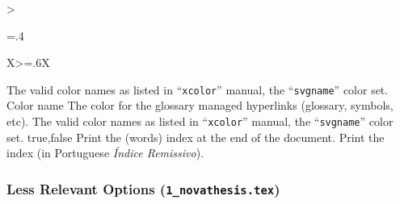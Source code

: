 \begin{xltabular}{\linewidth}{>{\hsize=.4\hsize\raggedright\arraybackslash}X>{\hsize=.6\hsize}X}
	{%
		The valid color names as listed in “\texttt{xcolor}” manual, the “\texttt{svgname}” color set.
    }
    \midrule
    {Color name}%
    {The color for the glossary managed hyperlinks (glossary, symbols, etc).}%
	{%
		The valid color names as listed in “\texttt{xcolor}” manual, the “\texttt{svgname}” color set.
    }
    \midrule
    {true,\newline false }%
    {Print the (words) index at the end of the document.}%
	{%
		Print the index (in Portuguese \emph{Índice Remissivo}).
    }
    \bottomrule
\end{xltabular}
\egroup


\subsubsection{Less Relevant Options (\texttt{1\_novathesis.tex})} %
\label{ssub:less_relevant_options_1}


